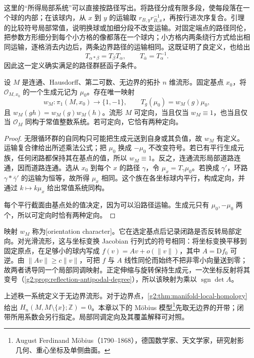 这里的“所得局部系统”可以直接按路径写出。将路径分成有限多段，使每段落在一个球的内部；在该球内，从 \(x\) 到 \(y\) 的运输取 \(r_{B,y}r_{B,x}^{-1}\)，再按行进次序复合。引理的比较符号局部常值，说明换球或加细分段不改变运输。对固定端点的路径同伦，把参数方形细分到每个小方格的像都落在一个球内；小方格内两条绕行方式给出相同运输，逐格消去内边后，两条边界路径的运输相同。这既证明了良定义，也给出
\[
	T_{\alpha*\beta}=T_\beta T_\alpha,\qquad T_{\bar\alpha}=T_\alpha^{-1}.
\]
因此这一定义确实满足的路径群胚函子条件。

\begin{proposition}\label{g2:prop:orientation-monodromy}
	设 \(M\) 是连通、Hausdorff、第二可数、无边界的拓扑 \(n\) 维流形。固定基点 \(x_0\)，将 \(\mathcal O_{M,x_0}\) 的一个生成元记为 \(\mu_0\)。存在唯一映射
	\[
		w_M:\pi_1(M,x_0)\longrightarrow\{1,-1\},\qquad T_g(\mu_0)=w_M(g)\mu_0,
	\]
	且 \(w_M(gh)=w_M(g)w_M(h)\)。流形 \(M\) 可定向，当且仅当 \(w_M\equiv1\)，也当且仅当 \(\mathcal O_M\) 同构于常值整数系统。若可定向，它恰有两种定向。
\end{proposition}
\begin{proof}
	无限循环群的自同构只可能把生成元送到自身或其负值，故 \(w_M\) 有定义。运输复合律给出所述乘法公式；把 \(\mu_0\) 换成 \( -\mu_0\) 不改变符号。若已有平行生成元族，任何闭路都保持其在基点的值，所以 \(w_M\equiv1\)。反之，连通流形局部道路连通，因而道路连通。选从 \(x_0\) 到每个 \(x\) 的路径 \(\gamma\)，令 \(\mu_x=T_\gamma\mu_0\)。若换成 \(\gamma'\)，环路 \(\gamma*\bar\gamma'\) 的运输为恒等，故所得 \(\mu_x\) 相同。这个族在各坐标球内平行，构成定向，并通过 \(k\mapsto k\mu_x\) 给出常值系统同构。

	每个平行截面由基点处的值决定，因为可以沿路径运输。生成元只有 \(\mu_0,-\mu_0\) 两个，所以可定向时恰有两种定向。
\end{proof}

映射 \(w_M\) 称为[orientation character]。它在选定基点后记录闭路是否反转局部定向。对光滑流形，这与坐标变换 Jacobian 行列式的符号相同：将坐标变换平移到固定原点，在足够小的球内写成 \(f(v)=Av+o(\lVert v\rVert)\)，其中 \(A=\mathrm Df_0\) 可逆。由 \(\lVert Av\rVert\geq c\lVert v\rVert\)，可把 \(f\) 与 \(A\) 线性同伦而始终不把非零小向量送到零；故两者诱导同一个局部同调映射。正定伸缩与旋转保持生成元，一次坐标反射将其变号（\cref{g2:prop:reflection-antipodal-degree}），所以该映射为乘以 \(\operatorname{sgn}\det A\)。

\ProseParagraphBreak

上述秩一系统定义于无边界流形。对于边界点，\cref{g2:thm:manifold-local-homology}给出 \(H_n(M,M\setminus\{x\};\mathbb Z)=0\)。本章以下的 Möbius 模型\footnote{August Ferdinand Möbius（1790--1868），德国数学家、天文学家，研究射影几何、重心坐标及单侧曲面。}先取无边界的开带；闭带所用系数会另行指定。局部同调定向及其覆盖解释可对照\cite[第3.3节，Orientations and Homology；第3.H节]{Hatcher2002}。

